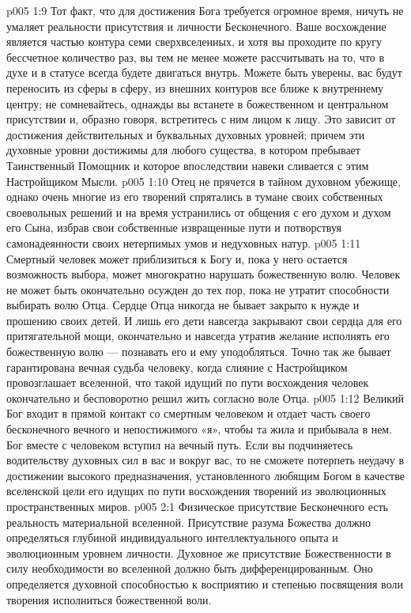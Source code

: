 \vs p005 1:9 Тот факт, что для достижения Бога требуется огромное время, ничуть не умаляет реальности присутствия и личности Бесконечного. Ваше восхождение является частью контура семи сверхвселенных, и хотя вы проходите по кругу бессчетное количество раз, вы тем не менее можете рассчитывать на то, что в духе и в статусе всегда будете двигаться внутрь. Можете быть уверены, вас будут переносить из сферы в сферу, из внешних контуров все ближе к внутреннему центру; не сомневайтесь, однажды вы встанете в божественном и центральном присутствии и, образно говоря, встретитесь с ним лицом к лицу. Это зависит от достижения действительных и буквальных духовных уровней; причем эти духовные уровни достижимы для любого существа, в котором пребывает Таинственный Помощник и которое впоследствии навеки сливается с этим Настройщиком Мысли.
\vs p005 1:10 \pc Отец не прячется в тайном духовном убежище, однако очень многие из его творений спрятались в тумане своих собственных своевольных решений и на время устранились от общения с его духом и духом его Сына, избрав свои собственные извращенные пути и потворствуя самонадеянности своих нетерпимых умов и недуховных натур.
\vs p005 1:11 Смертный человек может приблизиться к Богу и, пока у него остается возможность выбора, может многократно нарушать божественную волю. Человек не может быть окончательно осужден до тех пор, пока не утратит способности выбирать волю Отца. Сердце Отца никогда не бывает закрыто к нужде и прошению своих детей. И лишь его дети навсегда закрывают свои сердца для его притягательной мощи, окончательно и навсегда утратив желание исполнять его божественную волю --- познавать его и ему уподобляться. Точно так же бывает гарантирована вечная судьба человеку, когда слияние с Настройщиком провозглашает вселенной, что такой идущий по пути восхождения человек окончательно и бесповоротно решил жить согласно воле Отца.
\vs p005 1:12 Великий Бог входит в прямой контакт со смертным человеком и отдает часть своего бесконечного вечного и непостижимого «я», чтобы та жила и прибывала в нем. Бог вместе с человеком вступил на вечный путь. Если вы подчиняетесь водительству духовных сил в вас и вокруг вас, то не сможете потерпеть неудачу в достижении высокого предназначения, установленного любящим Богом в качестве вселенской цели его идущих по пути восхождения творений из эволюционных пространственных миров.
\vs p005 2:1 Физическое присутствие Бесконечного есть реальность материальной вселенной. Присутствие разума Божества должно определяться глубиной индивидуального интеллектуального опыта и эволюционным уровнем личности. Духовное же присутствие Божественности в силу необходимости во вселенной должно быть дифференцированным. Оно определяется духовной способностью к восприятию и степенью посвящения воли творения исполниться божественной воли.
